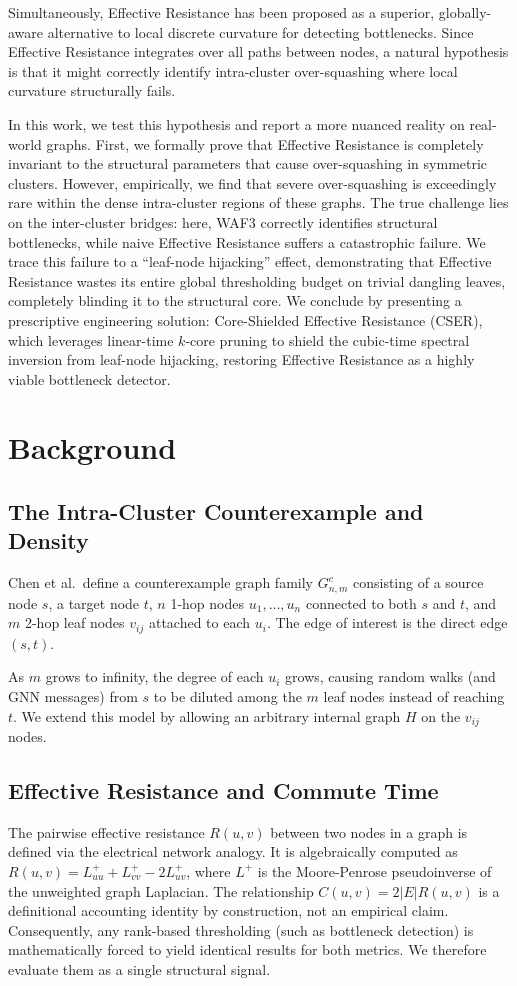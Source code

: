 \documentclass[10pt]{article} %
\begin{document}
Simultaneously, Effective Resistance has been proposed as a superior, globally-aware alternative to local discrete curvature for detecting bottlenecks. Since Effective Resistance integrates over all paths between nodes, a natural hypothesis is that it might correctly identify intra-cluster over-squashing where local curvature structurally fails.

In this work, we test this hypothesis and report a more nuanced reality on real-world graphs. First, we formally prove that Effective Resistance is completely invariant to the structural parameters that cause over-squashing in symmetric clusters. However, empirically, we find that severe over-squashing is exceedingly rare within the dense intra-cluster regions of these graphs. The true challenge lies on the inter-cluster bridges: here, WAF3 correctly identifies structural bottlenecks, while naive Effective Resistance suffers a catastrophic failure. We trace this failure to a ``leaf-node hijacking'' effect, demonstrating that Effective Resistance wastes its entire global thresholding budget on trivial dangling leaves, completely blinding it to the structural core. We conclude by presenting a prescriptive engineering solution: Core-Shielded Effective Resistance (CSER), which leverages linear-time $k$-core pruning to shield the cubic-time spectral inversion from leaf-node hijacking, restoring Effective Resistance as a highly viable bottleneck detector.

\section{Background}
\subsection{The Intra-Cluster Counterexample and Density}
Chen et al.\ define a counterexample graph family $G^c_{n,m}$ consisting of a source node $s$, a target node $t$, $n$ 1-hop nodes $u_1, \dots, u_n$ connected to both $s$ and $t$, and $m$ 2-hop leaf nodes $v_{ij}$ attached to each $u_i$. The edge of interest is the direct edge $(s,t)$.

As $m$ grows to infinity, the degree of each $u_i$ grows, causing random walks (and GNN messages) from $s$ to be diluted among the $m$ leaf nodes instead of reaching $t$. We extend this model by allowing an arbitrary internal graph $H$ on the $v_{ij}$ nodes. 

\subsection{Effective Resistance and Commute Time}
The pairwise effective resistance $R(u,v)$ between two nodes in a graph is defined via the electrical network analogy. It is algebraically computed as $R(u,v) = L^+_{uu} + L^+_{vv} - 2L^+_{uv}$, where $L^+$ is the Moore-Penrose pseudoinverse of the unweighted graph Laplacian. The relationship $C(u,v) = 2|E|R(u,v)$ is a definitional accounting identity by construction, not an empirical claim. Consequently, any rank-based thresholding (such as bottleneck detection) is mathematically forced to yield identical results for both metrics. We therefore evaluate them as a single structural signal.
\end{document}
